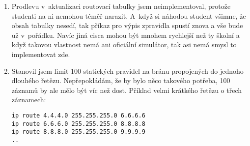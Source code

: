 \begin{enumerate}
 \item Prodlevu v~aktualizaci routovací tabulky jsem neimplementoval, protože studenti na ni nemohou téměř narazit. A~když si náhodou student všimne, že obsah tabulky nesedí, tak příkaz pro výpis zpravidla spustí znova a vše bude už v~pořádku. Navíc jiná cisca mohou být mnohem rychlejší než ty školní a když takovou vlastnost nemá ani oficiální simulátor, tak asi nemá smysl to implementovat zde.

 \item Stanovil jsem limit 100 statických pravidel na bránu propojených do jednoho dlouhého řetězu. Nepřepokládám, že by bylo něco takového potřeba, 100 záznamů by ale mělo být víc než dost. Příklad velmi krátkého řetězu o třech záznamech:
\begin{verbatim}
ip route 4.4.4.0 255.255.255.0 6.6.6.6
ip route 6.6.6.0 255.255.255.0 8.8.8.8
ip route 8.8.8.0 255.255.255.0 9.9.9.9
..
\end{verbatim} 


\end{enumerate}


